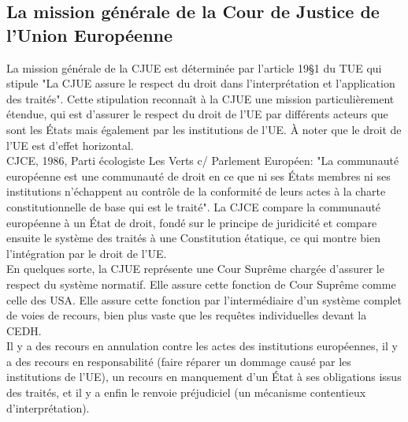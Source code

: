 \documentclass[10pt, a4paper, openany]{book}
\begin{document}
\subsection{La mission générale de la Cour de Justice de l'Union Européenne}

La mission générale de la CJUE est déterminée par l'article 19§1 du TUE qui stipule "La CJUE assure le respect du droit dans l'interprétation et l'application des traités". Cette stipulation reconnaît à la CJUE une mission particulièrement étendue, qui est d'assurer le respect du droit de l'UE par différents acteurs que sont les États mais également par les institutions de l'UE. À noter que le droit de l'UE est d'effet horizontal. \\
CJCE, 1986, Parti écologiste Les Verts c/ Parlement Européen: "La communauté européenne est une communauté de droit en ce que ni ses États membres ni ses institutions n'échappent au contrôle de la conformité de leurs actes à la charte constitutionnelle de base qui est le traité". La CJCE compare la communauté européenne à un État de droit, fondé sur le principe de juridicité et compare ensuite le système des traités à une Constitution étatique, ce qui montre bien l'intégration par le droit de l'UE. \\
En quelques sorte, la CJUE représente une Cour Suprême chargée d'assurer le respect du système normatif. Elle assure cette fonction de Cour Suprême comme celle des USA. Elle assure cette fonction par l'intermédiaire d'un système complet de voies de recours, bien plus vaste que les requêtes individuelles devant la CEDH. \\
Il y a des recours en annulation contre les actes des institutions européennes, il y a des recours en responsabilité (faire réparer un dommage causé par les institutions de l'UE), un recours en manquement d'un État à ses obligations issus des traités, et il y a enfin le renvoie préjudiciel (un mécanisme contentieux d'interprétation).
\end{document}
